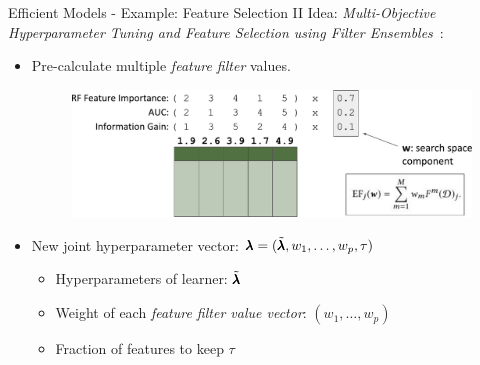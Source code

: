 \begin{frame}{Efficient Models - Example: Feature Selection II}
Idea: \emph{Multi-Objective Hyperparameter Tuning and Feature Selection  using Filter Ensembles}~:


  \begin{itemize}
    \item Pre-calculate multiple \emph{feature filter} values.
    
    \begin{figure}
      \centering
      \includegraphics[width = 0.7\linewidth]{images/mosmafs_presentation_p39.pdf}
    \end{figure}

    \item New joint hyperparameter vector: $\pmb{\lambda} = (\tilde{\pmb{\lambda}}, w_1, \ldots, w_p ,\tau )$
    \begin{itemize}
      \item Hyperparameters of learner: $\tilde{\pmb{\lambda}}$
      \item Weight of each \emph{feature filter value vector}: $(w_1, \ldots, w_p)$
      \item Fraction of features to keep $\tau$
    \end{itemize}
    
  \end{itemize}  

\end{frame}

